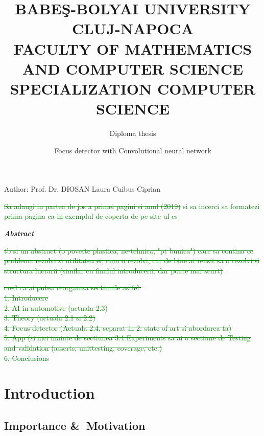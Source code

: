 \documentclass{article}
\title{\textbf{BABEŞ-BOLYAI UNIVERSITY CLUJ-NAPOCA \\ \vspace{1ex} 
FACULTY OF MATHEMATICS AND COMPUTER SCIENCE \\ \vspace{1ex}
SPECIALIZATION COMPUTER SCIENCE \vspace{5ex}}}
\author{\myfont Diploma thesis}
\date{\myfontE Focus detector with Convolutional neural network}
\begin{document}
\clearpage\maketitle
\thispagestyle{empty}

\vspace{32ex}
{ {\hspace*{8em}Author:}}
\newline
{\myfontE Prof. Dr. DIOSAN Laura {\hspace*{3em}Cuibus Ciprian}}
\begin{center}
    \vspace{3ex}
    {}
\end{center}


\textcolor{green}{\sout{Sa adaugi in partea de jos a primei pagini si anul (2019)} si sa incerci sa formatezi prima pagina ca in exemplul de coperta de pe site-ul cs}

\newpage
\begin{center}
    \textit{\textbf{ Abstract}} 
\end{center}


\textcolor{green}{\sout{tb si un abstract (o poveste plastica, ne-tehnica, "pt bunica") care sa contina ce problema rezolvi si utilitatea ei, cum o rezolvi, cat de bine ai reusit sa o rezolvi si structura lucrarii (similar cu finalul introducerii, dar poate mai scurt)}}

\textcolor{green}{\sout{cred ca ai putea reorganiza sectiunile astfel:\\
1. Introducere\\
2. AI in automotive (actuala 2.3)\\
3. Theory (actuala 2.1 si 2.2) \\
4. Focus detector (Actuala 2.4, separat in 2: state of art si abordarea ta)\\
5. App (si aici inainte de sectiunea 3.4 Experiments sa ai o sectiune de Testing and validation (asserts, unittesting, coverage, etc.)\\
6. Conclusions}}

\tableofcontents
\listoffigures
\listoftables

\newpage
{}
\section{Introduction}
    \subsection{Importance \&\ Motivation}
        
\end{document}
